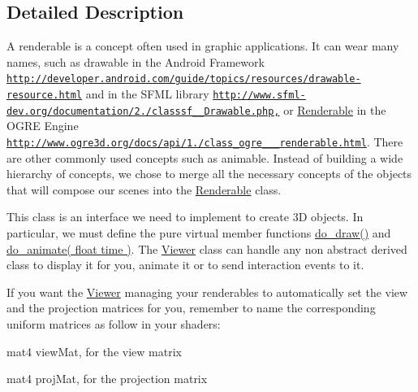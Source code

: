 \subsection{Detailed Description}
A renderable is a concept often used in graphic applications. It can wear many names, such as drawable in the Android Framework \href{http://developer.android.com/guide/topics/resources/drawable-resource.html}{\tt http\+://developer.\+android.\+com/guide/topics/resources/drawable-\/resource.\+html} and in the S\+F\+M\+L library \href{http://www.sfml-dev.org/documentation/2.0/classsf_1_1Drawable.php,}{\tt http\+://www.\+sfml-\/dev.\+org/documentation/2./classsf\+\_\+\_\+Drawable.\+php,} or \hyperlink{classRenderable}{Renderable} in the O\+G\+R\+E Engine \href{http://www.ogre3d.org/docs/api/1.9/class_ogre_1_1_renderable.html}{\tt http\+://www.\+ogre3d.\+org/docs/api/1./class\+\_\+ogre\+\_\+\_\+\_\+renderable.\+html}. There are other commonly used concepts such as animable. Instead of building a wide hierarchy of concepts, we chose to merge all the necessary concepts of the objects that will compose our scenes into the \hyperlink{classRenderable}{Renderable} class.

This class is an interface we need to implement to create 3\+D objects. In particular, we must define the pure virtual member functions \hyperlink{classRenderable_a98ab6308c1d2b56dacda7c435fb38d5b}{do\+\_\+draw()} and \hyperlink{classRenderable_aa5206322555c9dece40b21e797629b34}{do\+\_\+animate( float time )}. The \hyperlink{classViewer}{Viewer} class can handle any non abstract derived class to display it for you, animate it or to send interaction events to it.

If you want the \hyperlink{classViewer}{Viewer} managing your renderables to automatically set the view and the projection matrices for you, remember to name the corresponding uniform matrices as follow in your shaders\+:
\begin{DoxyItemize}
\item {\ttfamily mat4} {\ttfamily view\+Mat}, for the view matrix
\item {\ttfamily mat4} {\ttfamily proj\+Mat}, for the projection matrix
\end{DoxyItemize}


